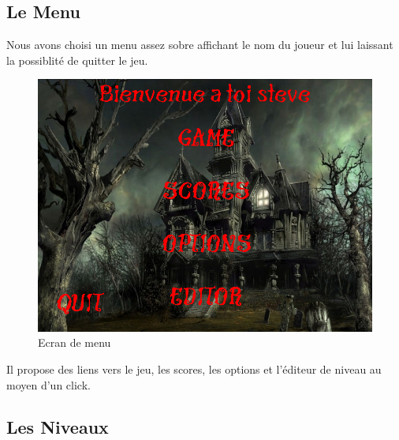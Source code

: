 \subsection{Le Menu}
Nous avons choisi un menu assez sobre affichant le nom du joueur et lui laissant la possiblité de quitter le jeu.
\begin{figure}[H]
\begin{center}
\includegraphics[scale=0.3]{img/menucomplet.png}
\caption {Ecran de menu}
\end{center}
\end{figure}
Il propose des liens vers le jeu, les scores, les options et l'éditeur de niveau au moyen d'un click.


\subsection{Les Niveaux}


